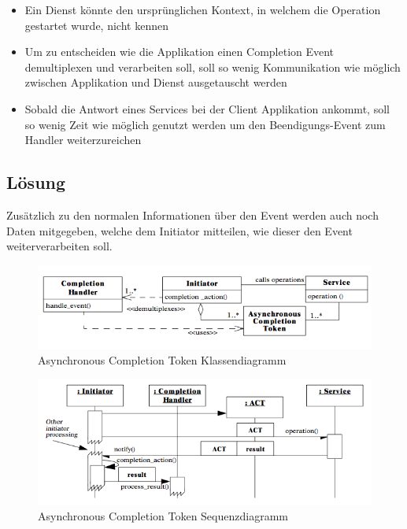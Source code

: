 \begin{itemize}
	\item Ein Dienst könnte den ursprünglichen Kontext, in welchem die Operation gestartet wurde, nicht kennen
	\item Um zu entscheiden wie die Applikation einen Completion Event demultiplexen und verarbeiten soll, soll so wenig Kommunikation wie möglich zwischen Applikation und Dienst ausgetauscht werden
	\item Sobald die Antwort eines Services bei der Client Applikation ankommt, soll so wenig Zeit wie möglich genutzt werden um den Beendigungs-Event zum Handler weiterzureichen
\end{itemize}


\subsection*{Lösung}

Zusätzlich zu den normalen Informationen über den Event werden auch noch Daten mitgegeben, welche dem Initiator mitteilen, wie dieser den Event weiterverarbeiten soll.

\begin{figure}[H]
	\centering
	\includegraphics[width=12cm]{content/posa2/asynchronous-completion-token/images/class-diagram.png}
	\caption{Asynchronous Completion Token Klassendiagramm}
\end{figure}



\begin{figure}[H]
	\centering
	\includegraphics[width=12cm]{content/posa2/asynchronous-completion-token/images/ssd.png}
	\caption{Asynchronous Completion Token Sequenzdiagramm}
\end{figure}


